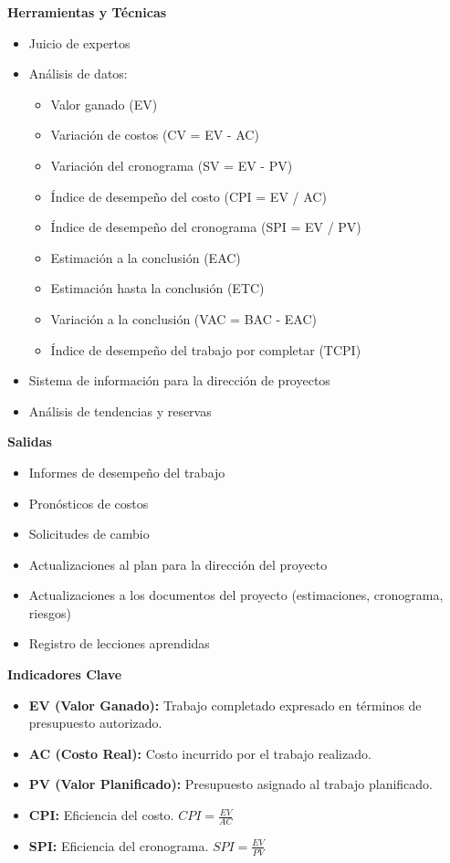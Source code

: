 \begin{multicols}{2}
        \textbf{Herramientas y Técnicas}
        \begin{itemize}
            \item Juicio de expertos
            \item Análisis de datos:
            \begin{itemize}
                \item Valor ganado (EV)
                \item Variación de costos (CV = EV - AC)
                \item Variación del cronograma (SV = EV - PV)
                \item Índice de desempeño del costo (CPI = EV / AC)
                \item Índice de desempeño del cronograma (SPI = EV / PV)
                \item Estimación a la conclusión (EAC)
                \item Estimación hasta la conclusión (ETC)
                \item Variación a la conclusión (VAC = BAC - EAC)
                \item Índice de desempeño del trabajo por completar (TCPI)
            \end{itemize}
            \item Sistema de información para la dirección de proyectos
            \item Análisis de tendencias y reservas
        \end{itemize}

        \textbf{Salidas}
        \begin{itemize}
            \item Informes de desempeño del trabajo
            \item Pronósticos de costos
            \item Solicitudes de cambio
            \item Actualizaciones al plan para la dirección del proyecto
            \item Actualizaciones a los documentos del proyecto (estimaciones, cronograma, riesgos)
            \item Registro de lecciones aprendidas
        \end{itemize}

        \textbf{Indicadores Clave}
        \begin{itemize}
            \item \textbf{EV (Valor Ganado):} Trabajo completado expresado en términos de presupuesto autorizado.
            \item \textbf{AC (Costo Real):} Costo incurrido por el trabajo realizado.
            \item \textbf{PV (Valor Planificado):} Presupuesto asignado al trabajo planificado.
            \item \textbf{CPI:} Eficiencia del costo. $CPI = \frac{EV}{AC}$
            \item \textbf{SPI:} Eficiencia del cronograma. $SPI = \frac{EV}{PV}$
        \end{itemize}
      \end{multicols}

